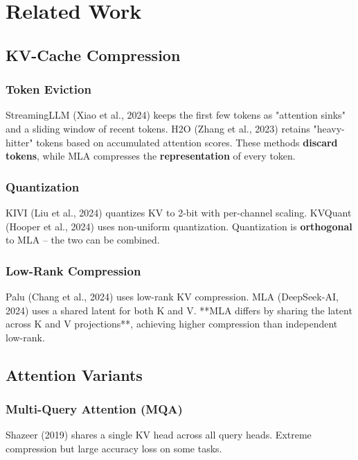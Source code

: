 
\section{Related Work}

\subsection{KV-Cache Compression}

\subsubsection{Token Eviction}

StreamingLLM (Xiao et al., 2024) keeps the first few tokens as "attention 
sinks" and a sliding window of recent tokens. H2O (Zhang et al., 2023) 
retains "heavy-hitter" tokens based on accumulated attention scores. These 
methods \textbf{discard tokens}, while MLA compresses the \textbf{representation} of 
every token.

\subsubsection{Quantization}

KIVI (Liu et al., 2024) quantizes KV to 2-bit with per-channel scaling. 
KVQuant (Hooper et al., 2024) uses non-uniform quantization. Quantization is 
\textbf{orthogonal} to MLA -- the two can be combined.

\subsubsection{Low-Rank Compression}

Palu (Chang et al., 2024) uses low-rank KV compression. MLA (DeepSeek-AI, 
2024) uses a shared latent for both K and V. **MLA differs by sharing the 
latent across K and V projections**, achieving higher compression than 
independent low-rank.

\subsection{Attention Variants}

\subsubsection{Multi-Query Attention (MQA)}

Shazeer (2019) shares a single KV head across all query heads. Extreme 
compression but large accuracy loss on some tasks.


